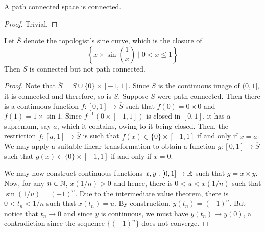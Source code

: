 \begin{proposition}
    A path connected space is connected.
\end{proposition}
\begin{proof}
    Trivial.
\end{proof}

\begin{example}
    Let $\overline S$ denote the topologist's sine curve, which is the closure of 
    \begin{equation*}
        \left\{x\times\sin\left(\frac{1}{x}\right)\mid 0 < x\le 1\right\}
    \end{equation*}
    Then $\overline S$ is connected but not path connected.
\end{example}
\begin{proof}
    Note that $\overline S = S\cup \{0\}\times[-1,1]$. Since $S$ is the continuous image of $(0,1]$, it is connected and therefore, so is $\overline S$. Suppose $\overline S$ were path connected. Then there is a continuous function $f:[0,1]\to\overline S$ such that $f(0) = 0\times 0$ and $f(1) = 1\times\sin 1$. Since $f^{-1}(0\times[-1,1])$ is closed in $[0,1]$, it has a supremum, say $a$, which it contains, owing to it being closed. Then, the restriction $\widetilde f:[a,1]\to\overline S$ is such that $f(x)\in\{0\}\times[-1,1]$ if and only if $x = a$. We may apply a suitable linear transformation to obtain a function $g: [0,1]\to\overline S$ such that $g(x)\in\{0\}\times[-1,1]$ if and only if $x = 0$.
    
    We may now construct continuous functions $x, y:[0,1]\to\mathbb{R}$ such that $g = x\times y$. Now, for any $n\in\mathbb{N}$, $x(1/n) > 0$ and hence, there is $0 < u < x(1/n)$ such that $\sin(1/u) = (-1)^n$. Due to the intermediate value theorem, there is $0 < t_n < 1/n$ such that $x(t_n) = u$. By construction, $y(t_n) = (-1)^n$. But notice that $t_n\to 0$ and since $y$ is continuous, we must have $y(t_n)\to y(0)$, a contradiction since the sequence $\{(-1)^n\}$ does not converge.
\end{proof}

